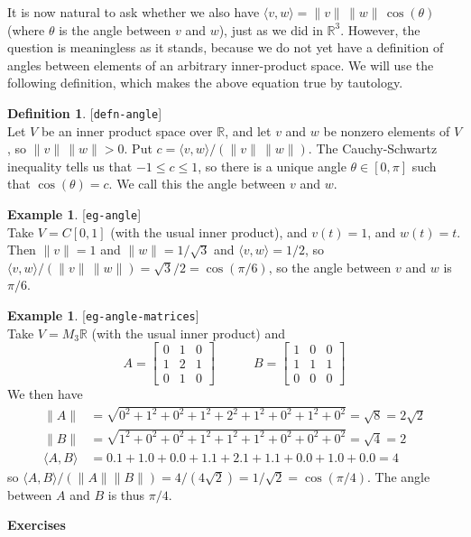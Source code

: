 \documentclass{amsart}
\newcommand{\lbl}[1]{\label{#1}\textup{[\texttt{#1}]}\ \\}
\newcommand{\lbl}{\label}
\newcommand{\R}         {{\mathbb{R}}}
\newcommand{\bsm}       {\left[\begin{smallmatrix}}
\newcommand{\esm}       {\end{smallmatrix}\right]}
\newcommand{\tht}       {\theta}
\newcommand{\ip}[1]     {\langle #1\rangle}
\renewcommand{\:}       {\colon}
\theoremstyle{definition}
\newtheorem{definition}[theorem]{Definition}
\newtheorem{example}[theorem]{Example}
\begin{document}
It is now natural to ask whether we also have
$\ip{v,w}=\|v\|\,\|w\|\,\cos(\tht)$ (where $\tht$ is the
angle between $v$ and $w$), just as we did in $\R^3$.
However, the question is meaningless as it stands, because
we do not yet have a definition of angles between elements
of an arbitrary inner-product space.  We will use  the
following definition, which makes the above equation true by
tautology. 
\begin{definition}\lbl{defn-angle}
 Let $V$ be an inner product space over $\R$, and let $v$
 and $w$ be nonzero elements of $V$, so $\|v\|\,\|w\|>0$.
 Put $c=\ip{v,w}/(\|v\|\,\|w\|)$.  The Cauchy-Schwartz
 inequality tells us that $-1\leq c\leq 1$, so there is a
 unique angle $\tht\in[0,\pi]$ such that $\cos(\tht)=c$.  We call this
 the angle between $v$ and $w$.
\end{definition}
\begin{example}\lbl{eg-angle}
 Take $V=C[0,1]$ (with the usual inner product), and
 $v(t)=1$, and $w(t)=t$.  Then $\|v\|=1$ and
 $\|w\|=1/\sqrt{3}$ and $\ip{v,w}=1/2$, so
 $\ip{v,w}/(\|v\|\,\|w\|)=\sqrt{3}/2=\cos(\pi/6)$, so the
 angle between $v$ and $w$ is $\pi/6$.  
\end{example}
\begin{example}\lbl{eg-angle-matrices}
 Take $V=M_3\R$ (with the usual inner product) and
 \[ A = \bsm 0 & 1 & 0 \\ 1 & 2 & 1 \\ 0 & 1 & 0 \esm
    \hspace{3em}
    B = \bsm 1 & 0 & 0 \\ 1 & 1 & 1 \\ 0 & 0 & 0 \esm
 \]
 We then have
 {\tiny \begin{align*}
  \|A\| &= \sqrt{0^2+1^2+0^2+1^2+2^2+1^2+0^2+1^2+0^2}=\sqrt{8}=2\sqrt{2} \\
  \|B\| &= \sqrt{1^2+0^2+0^2+1^2+1^2+1^2+0^2+0^2+0^2}=\sqrt{4}=2 \\
  \ip{A,B} &= 0.1+1.0+0.0+1.1+2.1+1.1+0.0+1.0+0.0 = 4
 \end{align*}}
 so
 $\ip{A,B}/(\|A\|\|B\|)=4/(4\sqrt{2})=1/\sqrt{2}=\cos(\pi/4)$.
 The angle between $A$ and $B$ is thus $\pi/4$.
\end{example}


\begin{center}
 \Large \textbf{Exercises}
\end{center}
\end{document}
